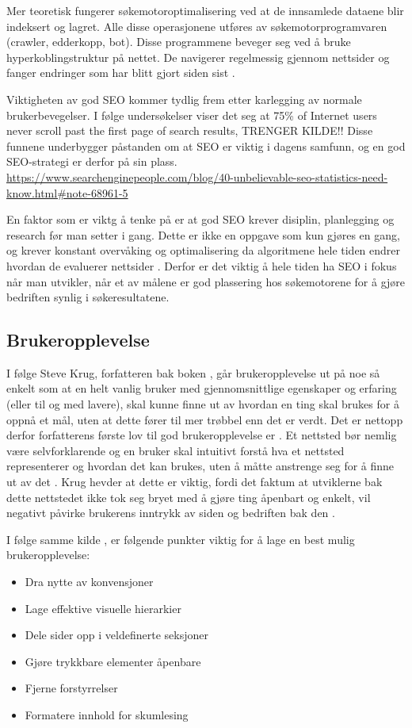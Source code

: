 Mer teoretisk fungerer søkemotoroptimalisering ved at de innsamlede dataene blir indeksert og lagret. Alle disse operasjonene utføres av søkemotorprogramvaren (crawler, edderkopp,
bot). Disse programmene beveger seg ved å bruke hyperkoblingstruktur på nettet. De navigerer regelmessig gjennom nettsider og fanger endringer som har blitt gjort siden sist  \cite[s.~488]{yalccin2010search}.

Viktigheten av god SEO kommer tydlig frem etter karlegging av normale brukerbevegelser. I følge undersøkelser viser det seg at 75\% of Internet users never scroll past the first page of search results, TRENGER KILDE!! 
Disse funnene underbygger påstanden om at SEO er viktig i dagens samfunn, og en god SEO-strategi er derfor på sin plass. 
\url{https://www.searchenginepeople.com/blog/40-unbelievable-seo-statistics-need-know.html#note-68961-5 }

En faktor som er viktg å tenke på er at god SEO krever disiplin, planlegging og research før man setter i gang. Dette er ikke en oppgave som kun gjøres en gang, og krever konstant overvåking og optimalisering da algoritmene hele tiden endrer hvordan de evaluerer nettsider \cite[s.~1]{mitchell2012usb}. Derfor er det viktig å hele tiden ha SEO i fokus når man utvikler, når et av målene er god plassering hos søkemotorene for å gjøre bedriften synlig i søkeresultatene.


\subsection{Brukeropplevelse}
\label{sec:ux}
I følge Steve Krug, forfatteren bak boken , går brukeropplevelse ut på noe så enkelt som at en helt vanlig bruker med gjennomsnittlige egenskaper og erfaring (eller til og med lavere), skal kunne finne ut av hvordan en ting skal brukes for å oppnå et mål, uten at dette fører til mer trøbbel enn det er verdt.
Det er nettopp derfor forfatterens første lov til god brukeropplevelse er . Et nettsted bør nemlig være selvforklarende og en bruker skal intuitivt forstå hva et nettsted representerer og hvordan det kan brukes, uten å måtte anstrenge seg for å finne ut av det \cite[s.~11]{krug2014dmt}.
Krug hevder at dette er viktig, fordi det faktum at utviklerne bak dette nettstedet ikke tok seg bryet med å gjøre ting åpenbart og enkelt, vil negativt påvirke brukerens inntrykk av siden og bedriften bak den \cite[s.~15]{krug2014dmt}.

I følge samme kilde \cite[s.~29]{krug2014dmt}, er følgende punkter viktig for å lage en best mulig brukeropplevelse:
\begin{itemize}
    \item Dra nytte av konvensjoner
    \item Lage effektive visuelle hierarkier
    \item Dele sider opp i veldefinerte seksjoner
    \item Gjøre trykkbare elementer åpenbare
    \item Fjerne forstyrrelser
    \item Formatere innhold for skumlesing
\end{itemize}

